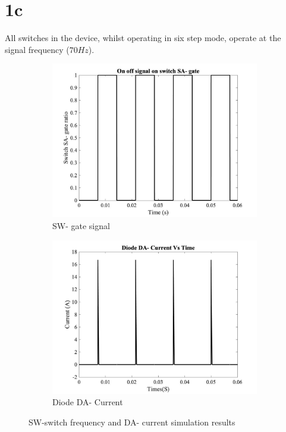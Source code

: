 \documentclass{article}
\begin{document}
\section*{1c} 
All switches in the device, whilst operating in six step mode, operate at the signal frequency ($70Hz$). 
\begin{figure}[H]
\begin{subfigure}{.5\textwidth}
  \centering
\includegraphics[scale=0.15]{SwitchDAN.jpg}
\caption{SW- gate signal}
\label{fig:s2}
\end{subfigure}%
\begin{subfigure}{.5\textwidth}
  \centering
\includegraphics[scale=0.15]{1c.jpg}
\caption{Diode DA- Current}
\label{fig:s3}
\end{subfigure}
\caption{SW-switch frequency and DA- current simulation results}
\label{fig:fig3}
\end{figure}
\end{document}
